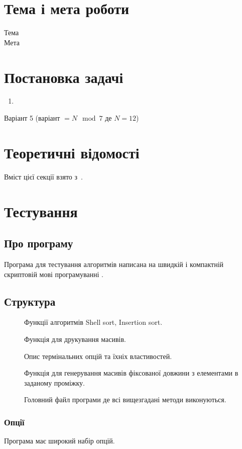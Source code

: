 \documentclass[\mainDocument]{subfiles}
\begin{document}
	\nocite{*}

	\chapter{Тема і мета роботи}
	 Тема\\
	 Мета
	\chapter{Постановка задачі}
	\begin{enumerate}
		\item
	\end{enumerate}
	Варіант 5 (варіант \(=N\mod7\) де \(N=12\))

	\chapter{Теоретичні відомості}
	Вміст цієї секції взято з~\cite{Karumanchi_2020}.

	\chapter{Тестування}
	\section{Про програму}
	Програма для тестування алгоритмів написана на швидкій і компактній скриптовій мові
	програмуванні .
	\section{Структура}
	\begin{description}
		\item[] Функції алгоритмів Shell sort, Insertion sort.
		\item[] Функція для друкування масивів.
		\item[] Опис термінальних опцій та їхніх властивостей.
		\item[] Функція для генерування масивів фіксованої довжини з елементами в заданому проміжку.
		\item[] Головний файл програми де всі вищезгадані методи виконуються.
	\end{description}
	\subsection{Опції}
	Програма має широкий набір опцій.
\end{document}
